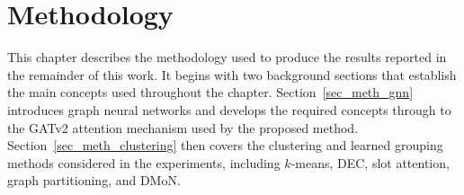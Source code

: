 
\chapter{Methodology}
\label{chap_3}



This chapter describes the methodology used to produce the results reported in the remainder of this work.
It begins with two background sections that establish the main concepts used throughout the chapter.
Section~\ref{sec_meth_gnn} introduces graph neural networks
and develops the required concepts through to the GATv2 attention mechanism used by the proposed method.
Section~\ref{sec_meth_clustering} then covers the clustering and learned grouping methods considered in the experiments,
including $k$-means, DEC, slot attention, graph partitioning, and DMoN.

